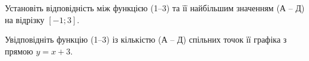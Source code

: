 \documentclass[12pt]{article}
\begin{document}
\begin{samepage}
\noindent\zadnum Установіть відповідність між функцією (1–3) та її найбільшим значенням (А – Д) на відрізку $[-1; 3]$. 

\nmtnobreak
\nopagebreak\nbvspace{0.3cm}

\nmtnobreak
\noindent
{}
\par{}\vspace{0.25cm}
\end{samepage}

\begin{samepage}
\noindent\zadnum Увідповідніть функцію (1–3) із кількістю (А – Д) спільних точок її графіка з прямою $y=x+3$. 

\nmtnobreak
\nopagebreak\nbvspace{0.3cm}

\nmtnobreak
\noindent
{}
\par{}\vspace{0.25cm}
\end{samepage}
\end{document}
